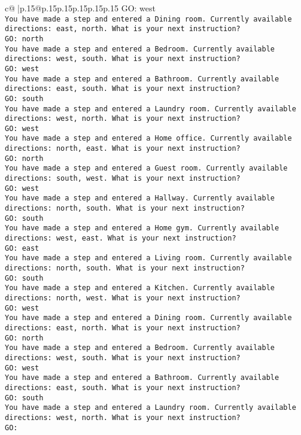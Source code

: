 \documentclass{article}
\begin{document}
{\begin{supertabular}{c@{$\;$}|p{.15\linewidth}@{}p{.15\linewidth}p{.15\linewidth}p{.15\linewidth}p{.15\linewidth}p{.15\linewidth}}
{{{GO: west\\ \tt You have made a step and entered a Dining room. Currently available directions: east, north. What is your next instruction?\\ \tt GO: north\\ \tt You have made a step and entered a Bedroom. Currently available directions: west, south. What is your next instruction?\\ \tt GO: west\\ \tt You have made a step and entered a Bathroom. Currently available directions: east, south. What is your next instruction?\\ \tt GO: south\\ \tt You have made a step and entered a Laundry room. Currently available directions: west, north. What is your next instruction?\\ \tt GO: west\\ \tt You have made a step and entered a Home office. Currently available directions: north, east. What is your next instruction?\\ \tt GO: north\\ \tt You have made a step and entered a Guest room. Currently available directions: south, west. What is your next instruction?\\ \tt GO: west\\ \tt You have made a step and entered a Hallway. Currently available directions: north, south. What is your next instruction?\\ \tt GO: south\\ \tt You have made a step and entered a Home gym. Currently available directions: west, east. What is your next instruction?\\ \tt GO: east\\ \tt You have made a step and entered a Living room. Currently available directions: north, south. What is your next instruction?\\ \tt GO: south\\ \tt You have made a step and entered a Kitchen. Currently available directions: north, west. What is your next instruction?\\ \tt GO: west\\ \tt You have made a step and entered a Dining room. Currently available directions: east, north. What is your next instruction?\\ \tt GO: north\\ \tt You have made a step and entered a Bedroom. Currently available directions: west, south. What is your next instruction?\\ \tt GO: west\\ \tt You have made a step and entered a Bathroom. Currently available directions: east, south. What is your next instruction?\\ \tt GO: south\\ \tt You have made a step and entered a Laundry room. Currently available directions: west, north. What is your next instruction?\\ \tt GO: }}}
\end{supertabular}}
\end{document}
